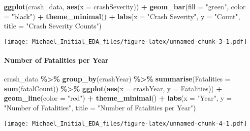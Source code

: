 \documentclass[
]{article}
\newenvironment{Shaded}{\begin{snugshade}}{\end{snugshade}}
\newcommand{\AttributeTok}[1]{\textcolor[rgb]{0.13,0.29,0.53}{#1}}
\newcommand{\FunctionTok}[1]{\textcolor[rgb]{0.13,0.29,0.53}{\textbf{#1}}}
\newcommand{\NormalTok}[1]{#1}
\newcommand{\SpecialCharTok}[1]{\textcolor[rgb]{0.81,0.36,0.00}{\textbf{#1}}}
\newcommand{\StringTok}[1]{\textcolor[rgb]{0.31,0.60,0.02}{#1}}
\begin{document}
\begin{Shaded}
\begin{Highlighting}[]
\FunctionTok{ggplot}\NormalTok{(crash\_data, }\FunctionTok{aes}\NormalTok{(}\AttributeTok{x =}\NormalTok{ crashSeverity)) }\SpecialCharTok{+}
  \FunctionTok{geom\_bar}\NormalTok{(}\AttributeTok{fill =} \StringTok{"green"}\NormalTok{, }\AttributeTok{color =} \StringTok{"black"}\NormalTok{) }\SpecialCharTok{+}
  \FunctionTok{theme\_minimal}\NormalTok{() }\SpecialCharTok{+}
  \FunctionTok{labs}\NormalTok{(}\AttributeTok{x =} \StringTok{"Crash Severity"}\NormalTok{, }\AttributeTok{y =} \StringTok{"Count"}\NormalTok{, }\AttributeTok{title =} \StringTok{"Crash Severity Counts"}\NormalTok{)}
\end{Highlighting}
\end{Shaded}

\texttt{[image: Michael\_Initial\_EDA\_files/figure-latex/unnamed-chunk-3-1.pdf]}

\hypertarget{number-of-fatalities-per-year}{%
\paragraph{Number of Fatalities per
Year}\label{number-of-fatalities-per-year}}

\begin{Shaded}
\begin{Highlighting}[]
\NormalTok{crash\_data }\SpecialCharTok{\%\textgreater{}\%}
  \FunctionTok{group\_by}\NormalTok{(crashYear) }\SpecialCharTok{\%\textgreater{}\%}
  \FunctionTok{summarise}\NormalTok{(}\AttributeTok{Fatalities =} \FunctionTok{sum}\NormalTok{(fatalCount)) }\SpecialCharTok{\%\textgreater{}\%}
  \FunctionTok{ggplot}\NormalTok{(}\FunctionTok{aes}\NormalTok{(}\AttributeTok{x =}\NormalTok{ crashYear, }\AttributeTok{y =}\NormalTok{ Fatalities)) }\SpecialCharTok{+}
  \FunctionTok{geom\_line}\NormalTok{(}\AttributeTok{color =} \StringTok{"red"}\NormalTok{) }\SpecialCharTok{+}
  \FunctionTok{theme\_minimal}\NormalTok{() }\SpecialCharTok{+}
  \FunctionTok{labs}\NormalTok{(}\AttributeTok{x =} \StringTok{"Year"}\NormalTok{, }\AttributeTok{y =} \StringTok{"Number of Fatalities"}\NormalTok{, }\AttributeTok{title =} \StringTok{"Number of Fatalities per Year"}\NormalTok{)}
\end{Highlighting}
\end{Shaded}

\texttt{[image: Michael\_Initial\_EDA\_files/figure-latex/unnamed-chunk-4-1.pdf]}
\end{document}
